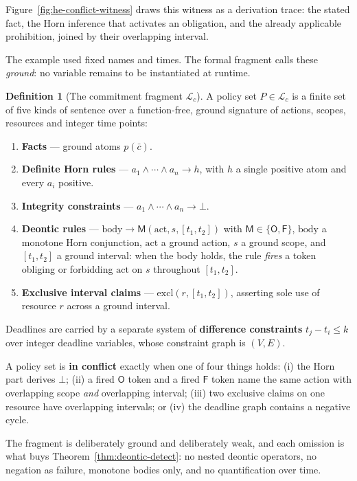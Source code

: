 \documentclass[11pt,a4paper]{article}
\theoremstyle{definition}
\newtheorem{definition}{Definition}[section]
\theoremstyle{definition}
\theoremstyle{remark}
\begin{document}
Figure~\ref{fig:he-conflict-witness} draws this witness as a derivation
trace: the stated fact, the Horn inference that activates an obligation,
and the already applicable prohibition, joined by their overlapping interval.



The example used fixed names and times. The formal fragment calls these
\emph{ground}: no variable remains to be instantiated at runtime.

\begin{definition}[The commitment fragment $\mathcal{L}_c$]\label{def:lc-fragment}
\setlength{\parskip}{4pt plus 1pt}
A policy set $P \in \mathcal{L}_c$ is a finite set of five kinds of sentence over
a function-free, ground signature of actions, scopes, resources and integer time
points:
\begin{enumerate}[leftmargin=1.8em,itemsep=1pt]
  \item \textbf{Facts} --- ground atoms $p(\bar{c})$.
  \item \textbf{Definite Horn rules} --- $a_1 \wedge \cdots \wedge a_n \to h$,
  with $h$ a single positive atom and every $a_i$ positive.
  \item \textbf{Integrity constraints} --- $a_1 \wedge \cdots \wedge a_n \to
  \bot$.
  \item \textbf{Deontic rules} ---
  $\mathrm{body} \to \mathsf{M}(\mathrm{act}, s, [t_1,t_2])$ with
  $\mathsf{M} \in \{\mathsf{O},\mathsf{F}\}$, $\mathrm{body}$ a monotone Horn
  conjunction, $\mathrm{act}$ a ground action, $s$ a ground scope, and
  $[t_1,t_2]$ a ground interval: when the body holds, the rule \emph{fires} a
  token obliging or forbidding $\mathrm{act}$ on $s$ throughout $[t_1,t_2]$.
  \item \textbf{Exclusive interval claims} --- $\mathrm{excl}(r,[t_1,t_2])$,
  asserting sole use of resource $r$ across a ground interval.


\end{enumerate}
Deadlines are carried by a separate system of \textbf{difference constraints}
$t_j - t_i \le k$ over integer deadline variables, whose constraint graph is
$(V,E)$.

A policy set is \textbf{in conflict} exactly when one of four things holds:
(i) the Horn part derives $\bot$; (ii) a fired $\mathsf{O}$ token and a fired
$\mathsf{F}$ token name the same action with overlapping scope \emph{and}
overlapping interval; (iii) two exclusive claims on one resource have
overlapping intervals; or (iv) the deadline graph contains a negative cycle.

The fragment is deliberately ground and deliberately weak, and each omission is
what buys Theorem~\ref{thm:deontic-detect}: no nested deontic operators, no
negation as failure, monotone bodies only, and no quantification over time.
\end{definition}
\end{document}
